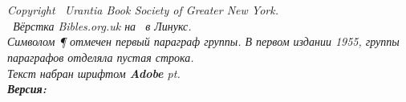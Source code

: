 \begin{center}
\bibcovertitlefont\urantiabook\\
\titlesepbig\\
\end{center}

\titleframe

\newpage

\begin{center}
\itshape
{}
Copyright \textcopyright\ Urantia Book Society of Greater New York.\\
\tux\ Вёрстка Bibles.org.uk на \XeLaTeX\ в Линукс.\\
Символом {\upshape \P} отмечен первый параграф группы. В первом издании 1955, группы параграфов отделяла пустая строка.\\
Текст набран шрифтом \textbf{Adobe \urantiamainfont} \urantiamainfontsize pt.\\[4pt]
\upshape\normalsize\bfseries Версия: \mytoday{}\\
\end{center}

\titleframe
